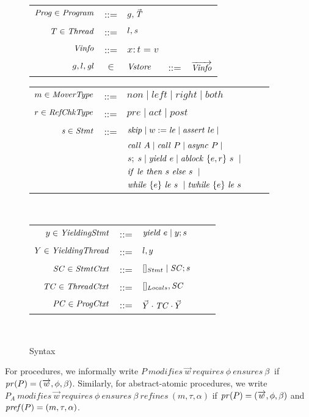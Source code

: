 \begin{figure}
\begin{tabular}{rclcl}
\end{tabular}
\begin{tabular}{rclcl}
$\mathit{Prog} \in \mathit{Program}$ & ::= & $g, \vec{\mathit{T}}$ \\
$T \in \mathit{Thread}$ & ::=  & $l, \mathit{s}$ \\
$\mathit{Vinfo}$ & ::= & $x:t=v$ \\
$g,l,\mathit{gl}$ & $\in$ & $\mathit{Vstore}$ & ::= & $\overrightarrow{\mathit{Vinfo}}$ \\
\end{tabular}
\begin{tabular}{rclcl}
$m \in \mathit{MoverType}$ &::= &$\mathit{non} \mid \mathit{left} \mid \mathit{right} \mid \mathit{both}$ \\
$r \in \mathit{RefChkType}$ &::= &$\mathit{pre} \mid \mathit{act} \mid \mathit{post} $ \\
$\mathit{s} \in \mathit{Stmt}$ &::= & $\mathit{skip} \mid w := \mathit{le} \mid
\mathit{assert}\ le \mid $ \\
                  & & $\mathit{call}\ A \mid \mathit{call}\ P \mid \mathit{async}\ P \mid $\\
                  & & $s;\;s \mid \mathit{yield}\ e \mid \mathit{ablock}\ {\{e,r\}}\ {s}\  \mid$\\
                 & & ${\mathit{if}\ {\mathit{le}}\ }{\mathit{then}\ {s}\ }{\mathit{else}\ {s}\ } \mid$ \\
                  & & $\mathit{while}\ \{{e}\}\ {{\mathit{le}}\ } {{s}\ } \mid \mathit{twhile}\ \{{e}\}\ {{\mathit{le}}\ } {{s}\ }$
                  \\ 
\end{tabular}\\
\begin{tabular}{rclcl}
$y \in \mathit{YieldingStmt}$ &::= &$\mathit{yield}\ e \mid y;s$ \\
$Y \in \mathit{YieldingThread}$ &::= &$l, y$ \\
$\mathit{SC} \in \mathit{StmtCtxt}$ &::= &$[]_{Stmt} \mid \mathit{SC};s$ \\
$\mathit{TC} \in \mathit{ThreadCtxt}$ &::= &$[]_{Locals}, \mathit{SC}$ \\
$\mathit{PC} \in \mathit{ProgCtxt}$ &::= &$\vec{Y} \cdot \mathit{TC} \cdot \vec{Y}$ \\
\end{tabular}\\
\setlength{\tabcolsep}{6pt}
\caption{Syntax}
\label{fig:syntax}
\end{figure}

For procedures, we informally write $P\ \mathit{modifies}\
\overrightarrow{w}\ \mathit{requires}\ \phi\ \mathit{ensures}\ \beta\ $
if $\mathit{pr}(P) = (\overrightarrow{w}, \phi, \beta)$. Similarly, for
abstract-atomic procedures, we write $P_{A}\ \mathit{modifies}\
\overrightarrow{w}\ \mathit{requires}\ \phi\ \mathit{ensures}\ \beta\
\mathit{refines}\ (m, \tau, \alpha)$ if $\mathit{pr}(P) =
(\overrightarrow{w}, \phi, \beta)$ and $\mathit{pref}(P) = (m, \tau,
\alpha)$. 


